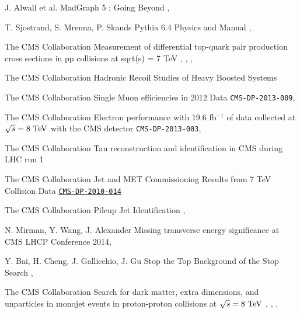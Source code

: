 {J. Alwall et al.}
{MadGraph 5 : Going Beyond}
{, }

{T. Sjostrand, S. Mrenna, P. Skands}
{Pythia 6.4 Physics and Manual}
{, }

{The CMS Collaboration}
{Measurement of differential top-quark pair production
cross sections in pp collisions at sqrt(s) = 7 TeV}
{, , , }

{The CMS Collaboration}
{Hadronic Recoil Studies of Heavy Boosted Systems}
{}


{The CMS Collaboration}
{Single Muon efficiencies in 2012 Data}
{\texttt{CMS-DP-2013-009}, }

{The CMS Collaboration}
{Electron performance with 19.6 fb$^{-1}$ of data collected at $\sqrt{s}=8~\text{TeV}$ with the CMS detector}
{\texttt{CMS-DP-2013-003}, }

{The CMS Collaboration}
{Tau reconstruction and identification in CMS during LHC run 1}
{}

{The CMS Collaboration}
{Jet and MET Commissioning Results from 7 TeV Collision Data}
{\href{http://cms.cern.ch/iCMS/jsp/openfile.jsp?type=DP&year=2010&files=DP2010_014.pdf}{\texttt{CMS-DP-2010-014}}}

{The CMS Collaboration}
{Pileup Jet Identification}
{, }


{N. Mirman, Y. Wang, J. Alexander}
{Missing transverse energy significance at CMS}
{LHCP Conference 2014, }

{Y. Bai, H. Cheng, J. Gallicchio, J. Gu}
{Stop the Top Background of the Stop Search}
{, }


{The CMS Collaboration}
{Search for dark matter, extra dimensions, and unparticles in monojet events in proton-proton collisions at $\sqrt{s} = 8~\text{TeV}$}
{, , , }

